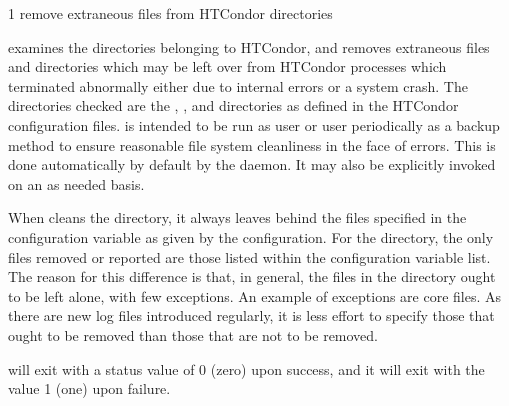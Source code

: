 \begin{ManPage}{\label{man-condor-preen}}{1}
{remove extraneous files from HTCondor directories}
\Synopsis {}


\Description 

 examines the directories belonging to HTCondor, 
and removes extraneous files and directories which may be left over from
HTCondor processes which terminated abnormally either due to internal errors or
a system crash. The directories checked are 
the , , and 
directories as defined in the HTCondor configuration files.  is
intended to be run as user  or user 
periodically as a backup
method to ensure reasonable file system cleanliness in the face of
errors. This is done automatically by default by the  daemon. 
It may also be explicitly invoked on an as needed basis.

When  cleans the  directory, it always leaves
behind the files specified in the configuration variable
 as given by the configuration.
For the  directory, the only files removed or reported are those
listed within the configuration variable  list.
The reason for this difference is that, in general,
the files in the  directory ought to be left alone,
with few exceptions.
An example of exceptions are core files.
As there are new log files introduced regularly,
it is less effort to specify those that ought to be removed
than those that are not to be removed.

\begin{Options}




\end{Options}

\ExitStatus

 will exit with a status value of 0 (zero) upon success,
and it will exit with the value 1 (one) upon failure.

\end{ManPage}
